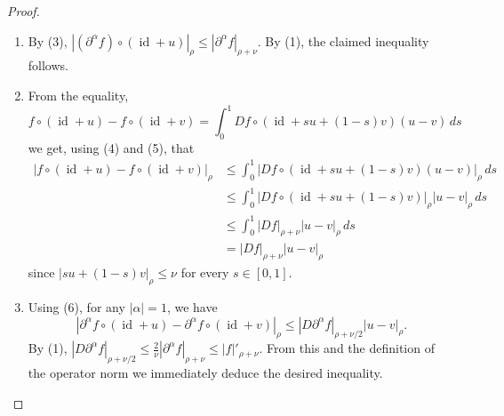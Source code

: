 \documentclass[12pt,reqno,a4paper]{amsart}%
\numberwithin{equation}{section}
\newcommand{\id}  {\operatorname{id}}
\begin{document}
\begin{proof}
\begin{enumerate}
$$\sum_k \int \left|(f_t)_k \right|dt\, e^{\rho|k|}
=\int |f_t|_\rho dt.
$$
\item  By (3), $|(\partial^\alpha f)\circ(\id+u)|_\rho \leq |\partial^\alpha f|_{\rho+\nu}$.  By (1), the claimed inequality follows. 
\item From the equality,
$$
 f\circ (\id+u)-f\circ(\id+v)=\int_0^1 Df\circ (\id + su+(1-s)v)(u-v)\,ds
$$
we get, using (4) and (5), that
\begin{align*}
| f\circ (\id+u)-f\circ(\id+v) |_\rho &\leq \int_0^1 |Df\circ (\id + su+(1-s)v)(u-v)|_\rho\,ds\\
&\leq \int_0^1 |Df\circ (\id + su+(1-s)v)|_\rho|u-v|_\rho\,ds\\
&\leq \int_0^1 |Df|_{\rho+\nu}|u-v|_\rho\,ds\\
&=|Df|_{\rho+\nu}|u-v|_\rho
\end{align*}
since $|su+(1-s)v|_\rho\leq\nu$ for every $s\in[0,1]$.
\item Using (6), for any $|\alpha|=1$, we have
$$
| \partial^\alpha f\circ (\id+u)-\partial^\alpha f\circ(\id+v) |_\rho \leq |D\partial^\alpha f|_{\rho+\nu/2}|u-v|_\rho.
$$
By (1), $|D\partial^\alpha f|_{\rho+\nu/2}\leq \frac{2}{\nu}|\partial^\alpha f|_{\rho+\nu}\leq |f|'_{\rho+\nu}$. From this and the definition of the operator norm we immediately deduce the desired inequality.
\end{enumerate}
\end{proof}


\end{document}
